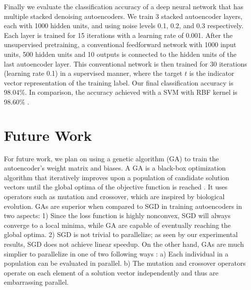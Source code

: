 \documentclass[conference]{IEEEtran}
\begin{document}
Finally we evaluate the classification accuracy of a deep neural network that has multiple stacked denoising autoencoders. We train 3 stacked autoencoder layers, each with 1000 hidden units, and using noise levels 0.1, 0.2, and 0.3 respectively. Each layer is trained for 15 iterations with a learning rate of 0.001. After the unsupervised pretraining, a conventional feedforward network with 1000 input units, 500 hidden units and 10 outputs is connected to the hidden units of the last autoencoder layer. This conventional network is then trained for 30 iterations (learning rate 0.1) in a supervised manner, where the target $t$ is the indicator vector representation of the training label. Our final classification accuracy is 98.04\%. In comparison, the accuracy achieved with a SVM with RBF kernel is 98.60\% \cite{vincent2010stacked}. 

\section{Future Work}
For future work, we plan on using a genetic algorithm (GA) to train the autoencoder's weight matrix and biases. A GA is a black-box optimization algorithm that iteratively improves upon a population of candidate solution vectors until the global optima of the objective function is reached \cite{srinivas1994genetic}. It uses operators such as mutation and crossover, which are inspired by biological evolution. GAs are superior when compared to SGD in training autoencoders in two aspects: 1) Since the loss function is highly nonconvex, SGD will always converge to a local minima, while GA are capable of eventually reaching the global optima. 2) SGD is not trivial to parallelize; as seen by our experimental results, SGD does not achieve linear speedup. On the other hand, GAs are much simplier to parallelize in one of two following ways \cite{cantu1998survey}: a) Each individual in a population can be evaluated in parallel. b) The mutation and crossover operators operate on each element of a solution vector independently and thus are embarrassing parallel.
\end{document}
